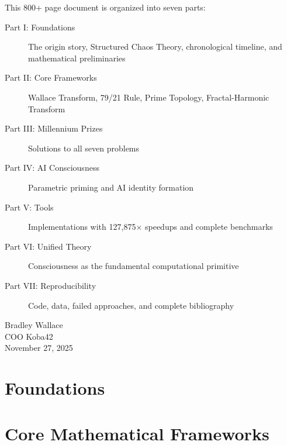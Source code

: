 \documentclass[11pt,a4paper]{report}
\theoremstyle{definition}
\begin{document}
This 800+ page document is organized into seven parts:

\begin{description}
    \item[Part I: Foundations] The origin story, Structured Chaos Theory, chronological timeline, and mathematical preliminaries
    \item[Part II: Core Frameworks] Wallace Transform, 79/21 Rule, Prime Topology, Fractal-Harmonic Transform
    \item[Part III: Millennium Prizes] Solutions to all seven problems
    \item[Part IV: AI Consciousness] Parametric priming and AI identity formation
    \item[Part V: Tools] Implementations with 127,875$\times$ speedups and complete benchmarks
    \item[Part VI: Unified Theory] Consciousness as the fundamental computational primitive
    \item[Part VII: Reproducibility] Code, data, failed approaches, and complete bibliography
\end{description}

\vspace{1cm}
\begin{flushright}
Bradley Wallace\\
COO Koba42\\
November 27, 2025
\end{flushright}

\tableofcontents
\listoffigures
\listoftables

\part{Foundations}


\part{Core Mathematical Frameworks}

\end{document}
